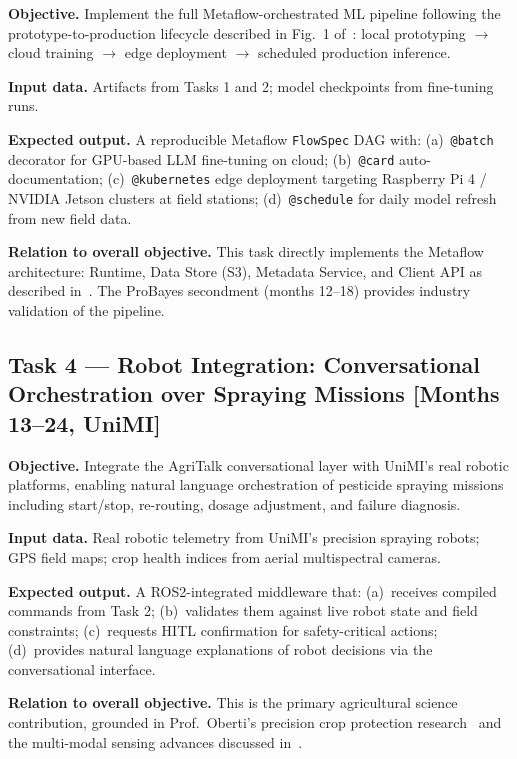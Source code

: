 \documentclass[11pt,a4paper]{article}
\begin{document}
\textbf{Objective.}
Implement the full Metaflow-orchestrated ML pipeline following the prototype-to-production
lifecycle described in Fig.~1 of~\cite{tagliabue_metaflow_2023}: local prototyping $\to$
cloud training $\to$ edge deployment $\to$ scheduled production inference.

\textbf{Input data.}
Artifacts from Tasks 1 and 2; model checkpoints from fine-tuning runs.

\textbf{Expected output.}
A reproducible Metaflow \texttt{FlowSpec} DAG with: (a)~\texttt{@batch} decorator for GPU-based
LLM fine-tuning on cloud; (b)~\texttt{@card} auto-documentation; (c)~\texttt{@kubernetes}
edge deployment targeting Raspberry Pi 4 / NVIDIA Jetson clusters at field stations;
(d)~\texttt{@schedule} for daily model refresh from new field data.

\textbf{Relation to overall objective.}
This task directly implements the Metaflow architecture: Runtime, Data Store (S3),
Metadata Service, and Client API as described in~\cite{tagliabue_metaflow_2023}.
The ProBayes secondment (months 12--18) provides industry validation of the pipeline.

\subsection{Task 4 — Robot Integration: Conversational Orchestration over Spraying Missions
  \textnormal{[Months 13--24, UniMI]}}

\textbf{Objective.}
Integrate the AgriTalk conversational layer with UniMI's real robotic platforms, enabling
natural language orchestration of pesticide spraying missions including start/stop,
re-routing, dosage adjustment, and failure diagnosis.

\textbf{Input data.}
Real robotic telemetry from UniMI's precision spraying robots; GPS field maps;
crop health indices from aerial multispectral cameras.

\textbf{Expected output.}
A ROS2-integrated middleware that: (a)~receives compiled commands from Task 2;
(b)~validates them against live robot state and field constraints;
(c)~requests HITL confirmation for safety-critical actions;
(d)~provides natural language explanations of robot decisions via the conversational interface.

\textbf{Relation to overall objective.}
This is the primary agricultural science contribution, grounded in Prof.\ Oberti's
precision crop protection research~\cite{oberti_2025} and the multi-modal sensing
advances discussed in~\cite{chen_2021}.
\end{document}
